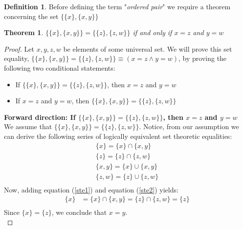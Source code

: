 \documentclass{book}
\newtheorem{theorem}{Theorem}[section]
\theoremstyle{definition}
\newtheorem{definition}{Definition}[section]
\theoremstyle{remark}
\begin{document}
\newpage
\begin{definition}

Before defining the term "\textit{ordered pair}" we require a theorem concerning the set $\{ \{ x \}, \{ x, y \} \}$

\begin{tcolorbox}
    \begin{theorem}
        $\{ \{ x \}, \{ x, y \} \} =  \{ \{ z \}, \{ z, w \} \}$ if and only if $x=z$ and $y=w$
    \end{theorem}
\end{tcolorbox}

\begin{proof}
    Let $x, y, z, w$ be elements of some universal set. We will prove this set equality, $\{ \{ x \}, \{ x, y \} \} =  \{ \{ z \}, \{ z, w \} \} \equiv (x=z \wedge y=w)$, by proving the following two conditional statements: 
        \begin{itemize}
            \item If $\{ \{ x \}, \{ x, y \} \} =  \{ \{ z \}, \{ z, w \} \}$, then $x=z$ and $y=w$
            \item If $x=z$ and $y=w$, then $\{ \{ x \}, \{ x, y \} \} =  \{ \{ z \}, \{ z, w \} \}$
        \end{itemize}
    
    \textbf{Forward direction: If $\{ \{ x \}, \{ x, y \} \} =  \{ \{ z \}, \{ z, w \} \}$, then $x=z$ and $y=w$} \\
    
        We assume that $\{ \{ x \}, \{ x, y \} \} =  \{ \{ z \}, \{ z, w \} \}$. Notice, from our assumption we can derive the following series of logically equivalent set theoretic equalities: 
            \begin{align}
                \{x\} = \{x\} \cap \{x,y\} \label{ste1} \\
                \{z\} = \{z\} \cap \{z,w\} \label{ste2} \\
                \{x,y\} = \{x\} \cup \{x,y\} \label{ste3} \\
                \{z,w\} =  \{z\} \cup \{z,w\} \label{ste4} \\
            \end{align}
        Now, adding equation (\ref{ste1}) and equation (\ref{ste2}) yields:
            \begin{align*}
                \{x\} & = \{x\} \cap \{x,y\} = \{z\} \cap \{z,w\} = \{z\} \\
            \end{align*}
        Since $\{x \} = \{ z \}$, we conclude that $x=y$. \\
        

\end{proof}
\end{definition}
\end{document}
